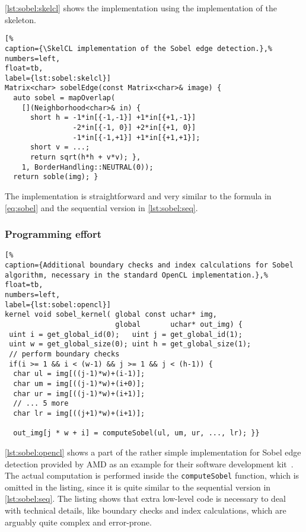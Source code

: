 \autoref{lst:sobel:skelcl} shows the \SkelCL implementation using the  implementation of the \stencil skeleton.
%
\begin{lstlisting}[%
caption={\SkelCL implementation of the Sobel edge detection.},%
numbers=left,
float=tb,
label={lst:sobel:skelcl}]
Matrix<char> sobelEdge(const Matrix<char>& image) {
  auto sobel = mapOverlap(
    [](Neighborhood<char>& in) {
      short h = -1*in[{-1,-1}] +1*in[{+1,-1}]
                -2*in[{-1, 0}] +2*in[{+1, 0}]
                -1*in[{-1,+1}] +1*in[{+1,+1}];
      short v = ...;
      return sqrt(h*h + v*v); },
    1, BorderHandling::NEUTRAL(0));
  return soble(img); }
\end{lstlisting}
%
The implementation is straightforward and very similar to the formula in \autoref{eq:sobel} and the sequential version in \autoref{lst:sobel:seq}.

\subsubsection*{Programming effort}

\begin{lstlisting}[%
caption={Additional boundary checks and index calculations for Sobel algorithm, necessary in the standard OpenCL implementation.},%
float=tb,
numbers=left,
label={lst:sobel:opencl}]
kernel void sobel_kernel( global const uchar* img,
                          global       uchar* out_img) {
 uint i = get_global_id(0);   uint j = get_global_id(1);
 uint w = get_global_size(0); uint h = get_global_size(1);
 // perform boundary checks
 if(i >= 1 && i < (w-1) && j >= 1 && j < (h-1)) {
  char ul = img[((j-1)*w)+(i-1)];
  char um = img[((j-1)*w)+(i+0)];
  char ur = img[((j-1)*w)+(i+1)];
  // ... 5 more
  char lr = img[((j+1)*w)+(i+1)];

  out_img[j * w + i] = computeSobel(ul, um, ur, ..., lr); }}
\end{lstlisting}

\autoref{lst:sobel:opencl} shows a part of the rather simple \OpenCL implementation for Sobel edge detection provided by AMD as an example for their software development kit~\cite{AMDSDK}.
The actual computation is performed inside the \texttt{computeSobel} function, which is omitted in the listing, since it is quite similar to the sequential version in \autoref{lst:sobel:seq}.
The listing shows that extra low-level code is necessary to deal with technical details, like boundary checks and index calculations, which are arguably quite complex and error-prone.

